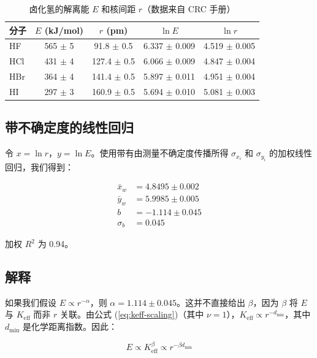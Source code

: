 \documentclass[11pt,a4paper]{article}
\newcommand{\Keff}{K_{\mathrm{eff}}}
\begin{document}
	\begin{table}[htbp]
		\centering
		\caption{卤化氢的解离能 \(E\) 和核间距 \(r\)（数据来自 CRC 手册）}
		\label{tab:HX}
		\begin{tabular}{lcccc}
			\toprule
			分子 & \(E\) (kJ/mol) & \(r\) (pm) & \(\ln E\) & \(\ln r\) \\
			\midrule
			HF  & 565 $\pm$ 5   & 91.8 $\pm$ 0.5  & 6.337 $\pm$ 0.009 & 4.519 $\pm$ 0.005 \\
			HCl & 431 $\pm$ 4   & 127.4 $\pm$ 0.5 & 6.066 $\pm$ 0.009 & 4.847 $\pm$ 0.004 \\
			HBr & 364 $\pm$ 4   & 141.4 $\pm$ 0.5 & 5.897 $\pm$ 0.011 & 4.951 $\pm$ 0.004 \\
			HI  & 297 $\pm$ 3   & 160.9 $\pm$ 0.5 & 5.694 $\pm$ 0.010 & 5.081 $\pm$ 0.003 \\
			\bottomrule
		\end{tabular}
	\end{table}
	
	\subsection{带不确定度的线性回归}
	
	令 \(x = \ln r\)，\(y = \ln E\)。使用带有由测量不确定度传播所得 \(\sigma_{x_i}\) 和 \(\sigma_{y_i}\) 的加权线性回归，我们得到：
	
	\begin{align}
		\bar{x}_w &= 4.8495 \pm 0.002 \\
		\bar{y}_w &= 5.9985 \pm 0.005 \\
		b &= -1.114 \pm 0.045 \\
		\sigma_b &= 0.045
	\end{align}
	
	加权 \(R^2\) 为 0.94。
	
	\subsection{解释}
	
	如果我们假设 \(E \propto r^{-\alpha}\)，则 \(\alpha = 1.114 \pm 0.045\)。这并不直接给出 \(\beta\)，因为 \(\beta\) 将 \(E\) 与 \(\Keff\) 而非 \(r\) 关联。由公式 (\ref{eq:keff-scaling})（其中 \(\nu = 1\)），\(\Keff \propto r^{-d_{\text{min}}}\)，其中 \(d_{\text{min}}\) 是化学距离指数。因此：
	
	\begin{equation}
		E \propto \Keff^{\beta} \propto r^{-\beta d_{\text{min}}}
		\label{eq:E-r-beta}
	\end{equation}
	
\end{document}
